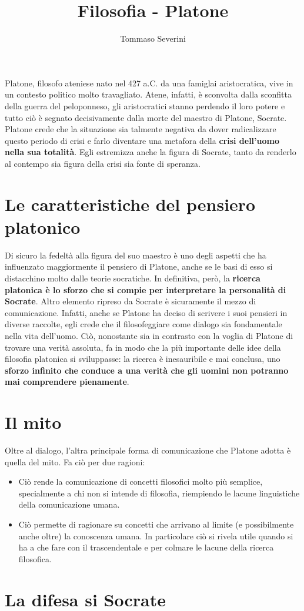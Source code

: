 \documentclass[10pt,a4paper]{article}
\author{Tommaso Severini}
\title{Filosofia - Platone}
\begin{document}
	\maketitle

  Platone, filosofo ateniese nato nel 427 a.C. da una famiglai aristocratica, vive in un contesto politico molto travagliato. Atene, infatti, è sconvolta dalla sconfitta della guerra del peloponneso, gli aristocratici stanno perdendo il loro potere e tutto ciò è segnato decisivamente dalla morte del maestro di Platone, Socrate. Platone crede che la situazione sia talmente negativa da dover radicalizzare questo periodo di crisi e farlo diventare una metafora della \textbf{crisi dell'uomo nella sua totalità}. Egli estremizza anche la figura di Socrate, tanto da renderlo al contempo sia figura della crisi sia fonte di speranza.

  \section{Le caratteristiche del pensiero platonico}

   Di sicuro la fedeltà alla figura del suo maestro è uno degli aspetti che ha influenzato maggiormente il pensiero di Platone, anche se le basi di esso si distacchino molto dalle teorie socratiche. In definitiva, però, la \textbf{ricerca platonica è lo sforzo che si compie per interpretare la personalità di Socrate}. Altro elemento ripreso da Socrate è sicuramente il mezzo di comunicazione. Infatti, anche se Platone ha deciso di scrivere i suoi pensieri in diverse raccolte, egli crede che il filosofeggiare come dialogo sia fondamentale nella vita dell'uomo. Ciò, nonostante sia in contrasto con la voglia di Platone di trovare una verità assoluta, fa in modo che la più importante delle idee della filosofia platonica si sviluppasse: la ricerca è inesauribile e mai conclusa, uno \textbf{sforzo infinito che conduce a una verità che gli uomini non potranno mai comprendere pienamente}.

   \section{Il mito}

   Oltre al dialogo, l'altra principale forma di comunicazione che Platone adotta è quella del mito. Fa ciò per due ragioni:
   \begin{itemize}
     \item Ciò rende la comunicazione di concetti filosofici molto più semplice, specialmente a chi non si intende di filosofia, riempiendo le lacune linguistiche della comunicazione umana.
     \item Ciò permette di ragionare su concetti che arrivano al limite (e possibilmente anche oltre) la conoscenza umana. In particolare ciò si rivela utile quando si ha a che fare con il trascendentale e per colmare le lacune della ricerca filosofica.
   \end{itemize}

   \section{La difesa si Socrate}

   
\end{document}
